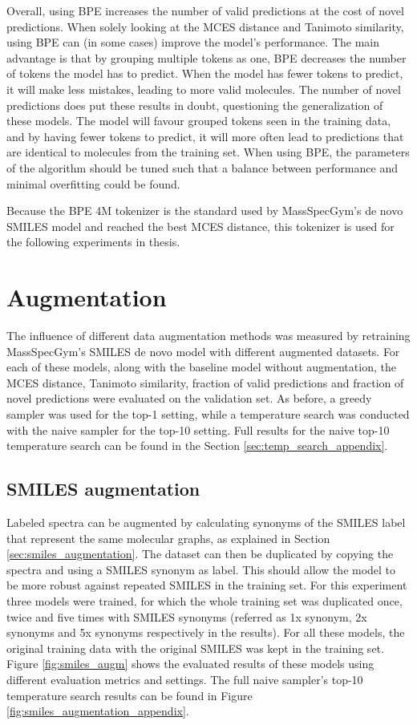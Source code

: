 Overall, using \ac{BPE} increases the number of valid predictions at the cost of novel predictions.
When solely looking at the MCES distance and Tanimoto similarity, using \ac{BPE} can (in some cases) improve the model's performance.
The main advantage is that by grouping multiple tokens as one, \ac{BPE} decreases the number of tokens the model has to predict.
When the model has fewer tokens to predict, it will make less mistakes, leading to more valid molecules.
The number of novel predictions does put these results in doubt, questioning the generalization of these models.
The model will favour grouped tokens seen in the training data, and by having fewer tokens to predict, it will more often lead to predictions that are identical to molecules from the training set.
When using \ac{BPE}, the parameters of the algorithm should be tuned such that a balance between performance and minimal overfitting could be found.

Because the \ac{BPE} 4M tokenizer is the standard used by MassSpecGym's de novo SMILES model and reached the best MCES distance, this tokenizer is used for the following experiments in thesis. 

\section{Augmentation}

The influence of different data augmentation methods was measured by retraining MassSpecGym's SMILES de novo model with different augmented datasets.
For each of these models, along with the baseline model without augmentation, the MCES distance, Tanimoto similarity, fraction of valid predictions and fraction of novel predictions were evaluated on the validation set.
As before, a greedy sampler was used for the top-1 setting, while a temperature search was conducted with the naive sampler for the top-10 setting.
Full results for the naive top-10 temperature search can be found in the Section \ref{sec:temp_search_appendix}.

\subsection{SMILES augmentation}

Labeled spectra can be augmented by calculating synonyms of the SMILES label that represent the same molecular graphs, as explained in Section \ref{sec:smiles_augmentation}.
The dataset can then be duplicated by copying the spectra and using a SMILES synonym as label.
This should allow the model to be more robust against repeated SMILES in the training set.
For this experiment three models were trained, for which the whole training set was duplicated once, twice and five times with SMILES synonyms (referred as 1x synonym, 2x synonyms and 5x synonyms respectively in the results).
For all these models, the original training data with the original SMILES was kept in the training set.
Figure \ref{fig:smiles_augm} shows the evaluated results of these models using different evaluation metrics and settings.
The full naive sampler's top-10 temperature search results can be found in Figure \ref{fig:smiles_augmentation_appendix}.

